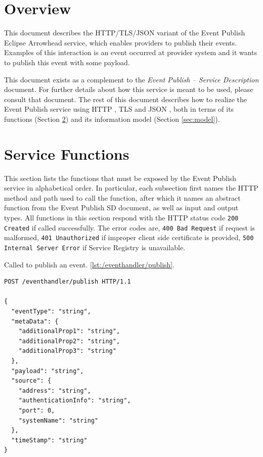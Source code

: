 \documentclass[a4paper]{arrowhead}
\newcommand{\fref}[1]{{\textcolor{ArrowheadBlue}{\hyperref[sec:functions:#1]{#1}}}}
\begin{document}
\section{Overview}
\label{sec:overview}

This document describes the HTTP/TLS/JSON variant of the Event Publish Eclipse Arrowhead service, which enables providers to publish their events.
Examples of this interaction is an event occurred at provider system and it wants to publish this event with some payload.

This document exists as a complement to the \textit{Event Publish -- Service Description} document.
For further details about how this service is meant to be used, please consult that document.
The rest of this document describes how to realize the Event Publish service using HTTP \cite{fielding2014hypertext}, TLS \cite{rescorla2018transport} and JSON \cite{bray2014json}, both in terms of its functions (Section \ref{sec:functions}) and its information model (Section \ref{sec:model}).

\newpage

\section{Service Functions}
\label{sec:functions}

This section lists the functions that must be exposed by the Event Publish service in alphabetical order.
In particular, each subsection first names the HTTP method and path used to call the function, after which it names an abstract function from the Event Publish SD document, as well as input and output types.
All functions in this section respond with the HTTP status code \texttt{200 Created} if called successfully. The error codes are, \texttt{400 Bad Request} if request is malformed, \texttt{401 Unauthorized} if improper client side certificate is provided, \texttt{500 Internal Server Error} if Service Registry is unavailable.


Called to publish an event. \ref{lst:/eventhandler/publish}.

\begin{lstlisting}[language=http,label={lst:/eventhandler/publish},caption={An \fref{Event Publish} invocation.}]
POST /eventhandler/publish HTTP/1.1

{
  "eventType": "string",
  "metaData": {
    "additionalProp1": "string",
    "additionalProp2": "string",
    "additionalProp3": "string"
  },
  "payload": "string",
  "source": {
    "address": "string",
    "authenticationInfo": "string",
    "port": 0,
    "systemName": "string"
  },
  "timeStamp": "string"
}

\end{lstlisting}
\newpage
\end{document}
